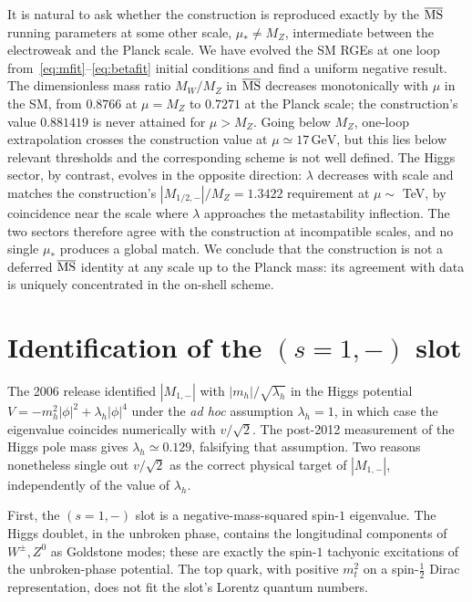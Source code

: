 \documentclass[twocolumn,aps,prd,floatfix,nofootinbib,superscriptaddress,10pt]{article}
\newcommand{\MW}{M_W}
\newcommand{\MZ}{M_Z}
\newcommand{\GeV}{\,\mathrm{GeV}}
\begin{document}
It is natural to ask whether the construction is reproduced exactly by the $\overline{\rm MS}$ running parameters at some other scale, $\mu_*\ne\MZ$, intermediate between the electroweak and the Planck scale. We have evolved the SM RGEs at one loop from~\eqref{eq:mfit}--\eqref{eq:betafit} initial conditions and find a uniform negative result. The dimensionless mass ratio $\MW/\MZ$ in $\overline{\rm MS}$ decreases monotonically with $\mu$ in the SM, from $0.8766$ at $\mu=\MZ$ to $0.7271$ at the Planck scale; the construction's value $0.881419$ is never attained for $\mu>\MZ$. Going below $\MZ$, one-loop extrapolation crosses the construction value at $\mu\simeq 17\GeV$, but this lies below relevant thresholds and the corresponding scheme is not well defined. The Higgs sector, by contrast, evolves in the opposite direction: $\lambda$ decreases with scale and matches the construction's $|M_{1/2,-}|/\MZ=1.3422$ requirement at $\mu\sim$ TeV, by coincidence near the scale where $\lambda$ approaches the metastability inflection. The two sectors therefore agree with the construction at incompatible scales, and no single $\mu_*$ produces a global match. We conclude that the construction is not a deferred $\overline{\rm MS}$ identity at any scale up to the Planck mass: its agreement with data is uniquely concentrated in the on-shell scheme.

\section{Identification of the $(s{=}1,-)$ slot}
\label{sec:identification}

The 2006 release identified $|M_{1,-}|$ with $|m_h|/\sqrt{\lambda_h}$ in the Higgs potential $V=-m_h^2|\phi|^2+\lambda_h|\phi|^4$ under the {\it ad hoc} assumption $\lambda_h=1$, in which case the eigenvalue coincides numerically with $v/\sqrt{2}$. The post-2012 measurement of the Higgs pole mass gives $\lambda_h\simeq 0.129$, falsifying that assumption. Two reasons nonetheless single out $v/\sqrt{2}$ as the correct physical target of $|M_{1,-}|$, independently of the value of $\lambda_h$.

First, the $(s=1,-)$ slot is a negative-mass-squared spin-$1$ eigenvalue. The Higgs doublet, in the unbroken phase, contains the longitudinal components of $W^\pm,Z^0$ as Goldstone modes; these are exactly the spin-$1$ tachyonic excitations of the unbroken-phase potential. The top quark, with positive $m_t^2$ on a spin-$\tfrac12$ Dirac representation, does not fit the slot's Lorentz quantum numbers.
\end{document}
